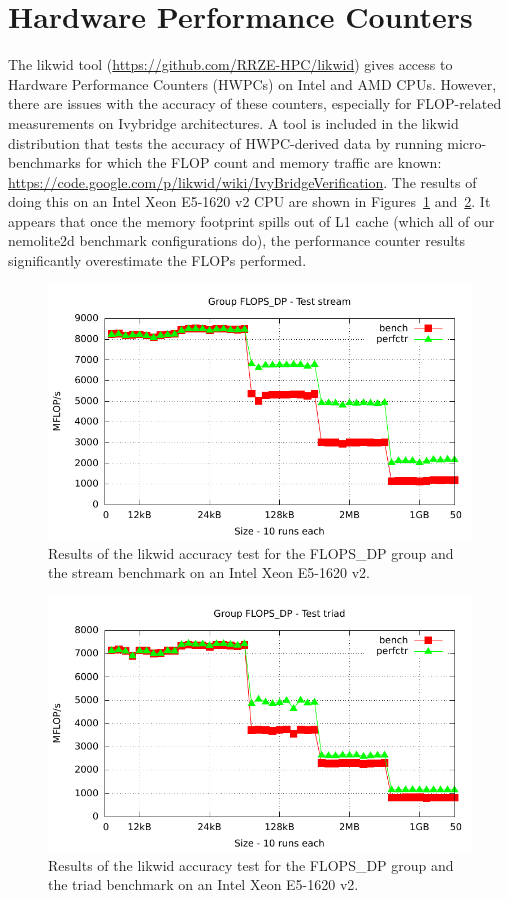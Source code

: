 \documentclass[12pt]{article}
\begin{document}
\section{Hardware Performance Counters}

The likwid tool (\url{https://github.com/RRZE-HPC/likwid}) gives
access to Hardware Performance Counters (HWPCs) on Intel and AMD CPUs.
However, there are issues with the accuracy of these counters,
especially for FLOP-related measurements on Ivybridge architectures. A
tool is included in the likwid distribution that tests the accuracy of
HWPC-derived data by running micro-benchmarks for which the FLOP count
and memory traffic are known:
\url{https://code.google.com/p/likwid/wiki/IvyBridgeVerification}.
The results of doing this on an Intel Xeon E5-1620 v2 CPU are shown in
Figures~\ref{FIG_flops_dp_stream_test}
and~\ref{FIG_flops_dp_triad_test}. It appears that once the memory
footprint spills out of L1 cache (which all of our nemolite2d
benchmark configurations do), the performance counter results
significantly overestimate the FLOPs performed.

\begin{figure}
\centering
\includegraphics[width=120mm]{FLOPS_DP_stream_ivybridgeEP.pdf}
\caption{Results of the likwid accuracy test for the FLOPS\_DP group
  and the stream benchmark on an Intel Xeon E5-1620 v2.}
\label{FIG_flops_dp_stream_test}
\end{figure}

\begin{figure}
\centering
\includegraphics[width=120mm]{FLOPS_DP_triad_ivybridgeEP.pdf}
\caption{Results of the likwid accuracy test for the FLOPS\_DP group
  and the triad benchmark on an Intel Xeon E5-1620 v2.}
\label{FIG_flops_dp_triad_test}
\end{figure}
\end{document}
